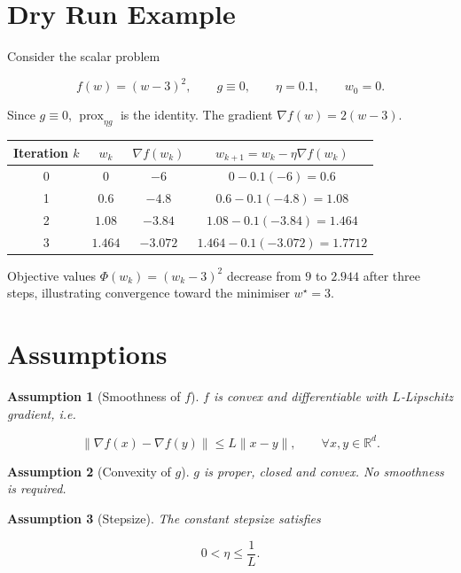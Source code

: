 \documentclass{article}
\newtheorem{assumption}{Assumption}
\begin{document}
\section*{Dry Run Example}

Consider the scalar problem  

\[
f(w)=(w-3)^2,\qquad g\equiv 0,\qquad \eta=0.1,\qquad w_0=0.
\]

Since $g\equiv0$, $\operatorname{prox}_{\eta g}$ is the identity.  
The gradient $\nabla f(w)=2(w-3)$.

\begin{center}
\begin{tabular}{c|c|c|c}
Iteration $k$ & $w_k$ & $\nabla f(w_k)$ & $w_{k+1}=w_k-\eta\nabla f(w_k)$\\ \hline
0 & $0$ & $-6$ & $0-0.1(-6)=0.6$ \\
1 & $0.6$ & $-4.8$ & $0.6-0.1(-4.8)=1.08$ \\
2 & $1.08$ & $-3.84$ & $1.08-0.1(-3.84)=1.464$ \\
3 & $1.464$ & $-3.072$ & $1.464-0.1(-3.072)=1.7712$
\end{tabular}
\end{center}

Objective values $\Phi(w_k)= (w_k-3)^2$ decrease from $9$ to $2.944$ after three steps, illustrating convergence toward the minimiser $w^\star=3$.

\section*{Assumptions}

\begin{assumption}[Smoothness of $f$]\label{ass:smooth}
$f$ is convex and differentiable with $L$‑Lipschitz gradient, i.e.  

\[
\|\nabla f(x)-\nabla f(y)\|\le L\|x-y\|,\qquad\forall x,y\in\mathbb{R}^d.
\tag{A1}
\]

\end{assumption}

\begin{assumption}[Convexity of $g$]\label{ass:convex}
$g$ is proper, closed and convex. No smoothness is required.
\end{assumption}

\begin{assumption}[Stepsize]\label{ass:stepsize}
The constant stepsize satisfies  

\[
0<\eta\le \frac{1}{L}.
\tag{A3}
\]

\end{assumption}
\end{document}
